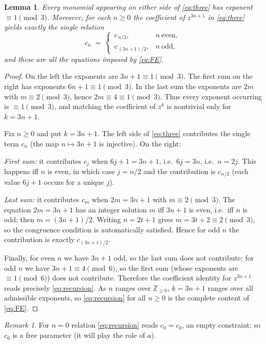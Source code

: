 \documentclass{amsart}
\newtheorem{lemma}{Lemma}
\theoremstyle{remark}
\newtheorem{remark}{Remark}
\begin{document}
\begin{lemma}\label{lem:exponents}
Every monomial appearing on either side of \eqref{eq:three} has exponent $\equiv 1\pmod 3$.
Moreover, for each $n\ge 0$ the coefficient of $z^{3n+1}$ in \eqref{eq:three} yields exactly the
single relation
\begin{equation}\label{eq:recursion}
c_n \;=\;
\begin{cases}
c_{\,n/2}, & n\ \text{even},\\[2pt]
c_{\,(3n+1)/2}, & n\ \text{odd},
\end{cases}
\end{equation}
and these are \emph{all} the equations imposed by \eqref{eq:FE}.
\end{lemma}
\begin{proof}
On the left the exponents are $3n+1\equiv1\pmod3$. The first sum on the right has exponents
$6n+1\equiv1\pmod3$. In the last sum the exponents are $2m$ with $m\equiv2\pmod3$, hence
$2m\equiv 4\equiv1\pmod 3$. Thus every exponent occurring is $\equiv1\pmod3$, and matching the
coefficient of $z^{k}$ is nontrivial only for $k=3n+1$.

Fix $n\ge0$ and put $k=3n+1$. The left side of \eqref{eq:three} contributes the single term
$c_n$ (the map $n\mapsto 3n+1$ is injective). On the right:

\emph{First sum:} it contributes $c_j$ when $6j+1=3n+1$, i.e.\ $6j=3n$, i.e.\ $n=2j$. This
happens iff $n$ is even, in which case $j=n/2$ and the contribution is $c_{n/2}$ (each value
$6j+1$ occurs for a unique $j$).

\emph{Last sum:} it contributes $c_m$ when $2m=3n+1$ with $m\equiv2\pmod3$. The equation
$2m=3n+1$ has an integer solution $m$ iff $3n+1$ is even, i.e.\ iff $n$ is odd; then
$m=(3n+1)/2$. Writing $n=2t+1$ gives $m=3t+2\equiv2\pmod3$, so the congruence condition is
automatically satisfied. Hence for odd $n$ the contribution is exactly $c_{(3n+1)/2}$.

Finally, for even $n$ we have $3n+1$ odd, so the last sum does not contribute; for odd $n$ we
have $3n+1\equiv 4\pmod 6$, so the first sum (whose exponents are $\equiv1\pmod6$) does not
contribute. Therefore the coefficient identity for $z^{3n+1}$ reads precisely
\eqref{eq:recursion}. As $n$ ranges over $\mathbb{Z}_{\ge0}$, $k=3n+1$ ranges over all admissible
exponents, so \eqref{eq:recursion} for all $n\ge0$ is the complete content of \eqref{eq:FE}.
\end{proof}

\begin{remark}
For $n=0$ relation \eqref{eq:recursion} reads $c_0=c_0$, an empty constraint; so $c_0$ is a free
parameter (it will play the role of $a$).
\end{remark}
\end{document}
